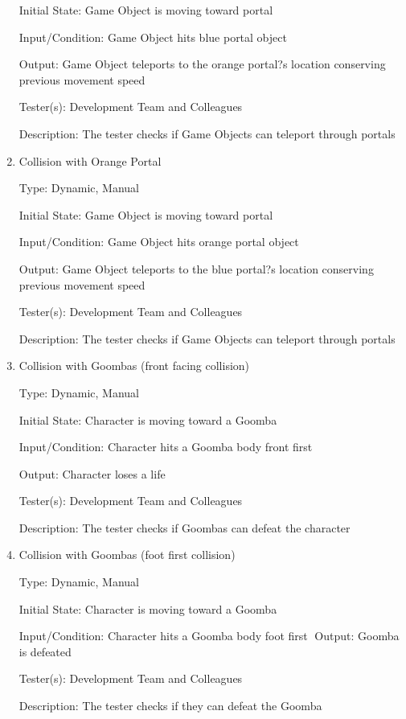\documentclass[12pt, titlepage]{article}
\begin{document}
\begin{enumerate}
Initial State: Game Object is moving toward portal

Input/Condition: Game Object hits blue portal object

Output: Game Object teleports to the orange portal?s location conserving previous movement speed

Tester(s): Development Team and Colleagues

Description: The tester checks if Game Objects can teleport through portals


\item{Collision with Orange Portal\\}

Type: Dynamic, Manual

Initial State: Game Object is moving toward portal

Input/Condition: Game Object hits orange portal object

Output: Game Object teleports to the blue portal?s location conserving previous movement speed

Tester(s): Development Team and Colleagues

Description: The tester checks if Game Objects can teleport through portals


\item{Collision with Goombas (front facing collision)\\}

Type: Dynamic, Manual

Initial State: Character is moving toward a Goomba

Input/Condition: Character hits a Goomba body front first

Output: Character loses a life

Tester(s): Development Team and Colleagues

Description: The tester checks if Goombas can defeat the character


\item{Collision with Goombas (foot first collision)\\}

Type: Dynamic, Manual

Initial State: Character is moving toward a Goomba

Input/Condition: Character hits a Goomba body foot first
Output: Goomba is defeated

Tester(s): Development Team and Colleagues

Description: The tester checks if they can defeat the Goomba



\end{enumerate}
\end{document}
